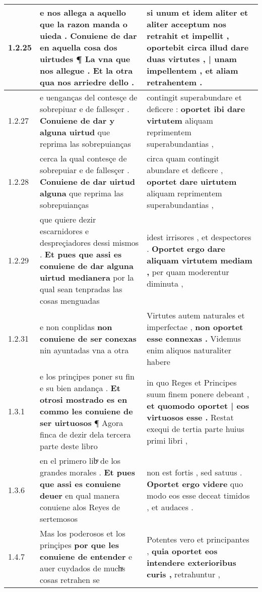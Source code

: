 \begin{tabular}{|p{1cm}|p{6.5cm}|p{6.5cm}|}
1.2.25 & e nos allega a aquello que la razon manda o uieda . \textbf{ Conuiene de dar en aquella cosa dos uirtudes ¶ La vna que nos allegue . } Et la otra qua nos arriedre dello . & si unum et idem aliter et aliter acceptum nos retrahit et impellit , \textbf{ oportebit circa illud dare duas virtutes , | unam impellentem , } et aliam retrahentem . \\\hline
1.2.27 & e uenganças del contesçe de sobrepiuar e de fallesçer . \textbf{ Conuiene de dar y alguna uirtud } que reprima las sobrepuianças & contingit superabundare et deficere : \textbf{ oportet ibi dare virtutem } aliquam reprimentem superabundantias , \\\hline
1.2.28 & cerca la qual contesçe de sobrepuiar e de fallesçer . \textbf{ Conuiene de dar uirtud alguna } que reprima las sobrepuianças & circa quam contingit abundare et deficere , \textbf{ oportet dare uirtutem } aliquam reprimentem superabundantias , \\\hline
1.2.29 & que quiere dezir escarnidores e despreçiadores dessi mismos . \textbf{ Et pues que assi es conuiene de dar alguna uirtud medianera } por la qual sean tenpradas las cosas menguadas & idest irrisores , et despectores . \textbf{ Oportet ergo dare aliquam virtutem mediam , } per quam moderentur diminuta , \\\hline
1.2.31 & e non conplidas \textbf{ non conuiene de ser conexas } nin ayuntadas vna a otra & Virtutes autem naturales et imperfectae , \textbf{ non oportet esse connexas . } Videmus enim aliquos naturaliter habere \\\hline
1.3.1 & e los prinçipes poner su fin e su bien andança . \textbf{ Et otrosi mostrado es en commo les conuiene de ser uirtuosos } ¶ Agora finca de dezir dela tercera parte deste libro & in quo Reges et Principes suum finem ponere debeant , \textbf{ et quomodo oportet | eos virtuosos esse . } Restat exequi de tertia parte huius primi libri , \\\hline
1.3.6 & en el primero libͤ de los grandes morales . \textbf{ Et pues que assi es conuiene deuer } en qual manera conuiene alos Reyes de sertemosos & non est fortis , sed satuus . \textbf{ Oportet ergo videre } quo modo eos esse deceat timidos , et audaces . \\\hline
1.4.7 & Mas los poderosos et los prinçipes \textbf{ por que les conuiene de entender } e auer cuydados de muchͣs cosas retrahen se & Potentes vero et principantes , \textbf{ quia oportet eos intendere exterioribus curis , } retrahuntur , \\\hline

\end{tabular}

